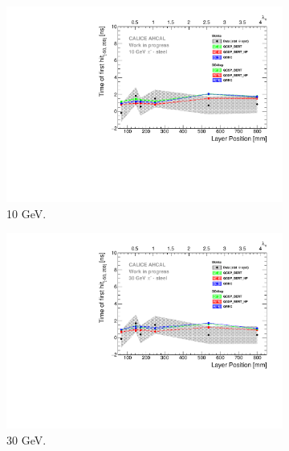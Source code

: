 \begin{figure}[htbp!]
  \begin{subfigure}[t]{0.5\textwidth}
    \centering
    \includegraphics[width=1\textwidth]{../Thesis_Plots/Timing/Pions/Plots/ComparisonToSim/Time_Depth_10GeV.pdf}
    \caption{10 GeV.}\label{fig:Depth_SimData_10GeV}
  \end{subfigure}
  \hfill
  \begin{subfigure}[t]{0.5\textwidth}
    \centering
    \includegraphics[width=1\textwidth]{../Thesis_Plots/Timing/Pions/Plots/ComparisonToSim/Time_Depth_30GeV.pdf}
    \caption{30 GeV.} \label{fig:Depth_SimData_30GeV}
  \end{subfigure}
  \hfill
  \begin{subfigure}[t]{0.5\textwidth}
    \centering

\end{subfigure}
\end{figure}
